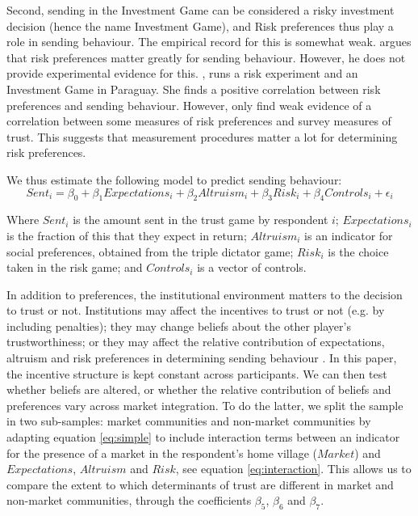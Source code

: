 Second, sending in the Investment Game can be considered a risky investment decision (hence the name Investment Game), and Risk preferences thus play a role in sending behaviour. The empirical record for this is somewhat weak. \cite{Karlan2005} argues that risk preferences matter greatly for sending behaviour. However, he does not provide experimental evidence for this. \cite{Schechter2007}, runs a risk experiment and an Investment Game in Paraguay. She finds a positive correlation between risk preferences and sending behaviour. However,  \cite{Eckel2004} only find weak evidence of a correlation between some measures of risk preferences and survey measures of trust. This suggests that measurement procedures matter a lot for determining risk preferences.

We thus estimate the following model to predict sending behaviour:
\begin{equation}
\label{eq:simple}
Sent_i = \beta_0 + \beta_1 Expectations_i + \beta_2 Altruism_i + \beta_3 Risk_i + \beta_4 Controls_i + \epsilon_i 
\end{equation} 

Where $Sent_i$ is the amount sent in the trust game by respondent $i$; $Expectations_i$ is the fraction of this that they expect in return;  $Altruism_i$ is an indicator for social preferences, obtained from the triple dictator game; $Risk_i$ is the choice taken in the risk game; and $Controls_i$ is a vector of controls.

In addition to preferences, the institutional environment matters to the decision to trust or not. Institutions may affect the incentives to trust or not (e.g. by including penalties); they may change beliefs about the other player's trustworthiness; or they may affect the relative contribution of expectations, altruism and risk preferences in determining sending behaviour \citep{Bohnet2007}. In this paper, the incentive structure is kept constant across participants. We can then test whether beliefs are altered, or whether the relative contribution of beliefs and preferences vary across market integration. To do the latter, we split the sample in two sub-samples: market communities and non-market communities by adapting equation \ref{eq:simple} to include interaction terms between an indicator for the presence of a market in the respondent's home village ($Market$) and $Expectations$, $Altruism$ and $Risk$, see equation \ref{eq:interaction}. This allows us to compare the extent to which determinants of trust are different in market and non-market communities, through the coefficients $\beta_5$, $\beta_6$ and $\beta_7$.

